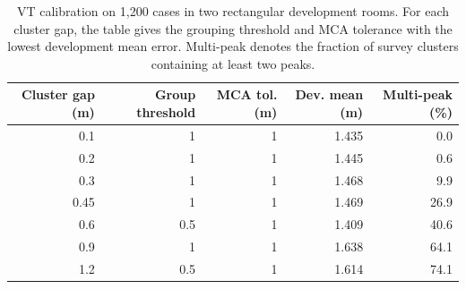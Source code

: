 \begin{table}[H]
\centering
\caption{VT calibration on 1,200 cases in two rectangular development rooms. For each cluster gap, the table gives the grouping threshold and MCA tolerance with the lowest development mean error. Multi-peak denotes the fraction of survey clusters containing at least two peaks.}
\label{tab:vtselection}
\setlength{\tabcolsep}{4pt}
\begin{tabular}{rrrrr}
\toprule
Cluster gap (m) & Group threshold & MCA tol. (m) & Dev. mean (m) & Multi-peak (\%)\\
\midrule
0.1 & 1 & 1 & 1.435 & 0.0\\
0.2 & 1 & 1 & 1.445 & 0.6\\
0.3 & 1 & 1 & 1.468 & 9.9\\
0.45 & 1 & 1 & 1.469 & 26.9\\
0.6 & 0.5 & 1 & 1.409 & 40.6\\
0.9 & 1 & 1 & 1.638 & 64.1\\
1.2 & 0.5 & 1 & 1.614 & 74.1\\
\bottomrule
\end{tabular}
\end{table}
